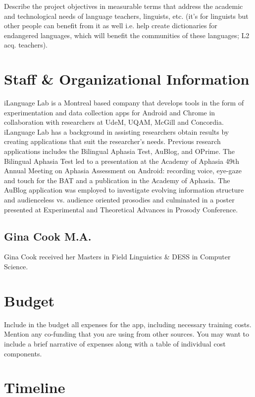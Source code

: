 \documentclass[12 pt]{article}
\begin{document}
Describe the project objectives in measurable terms that address the academic and technological needs of language teachers, linguists, etc. (it's for linguists but other people can benefit from it as well i.e. help create dictionaries for endangered languages, which will benefit the communities of these languages; L2 acq. teachers).  

\section {Staff \& Organizational Information}

 iLanguage Lab is a Montreal based company that develops tools in the form of experimentation and data collection apps for Android and Chrome in collaboration with researchers at UdeM, UQAM, McGill and Concordia. iLanguage Lab has a background in assisting researchers obtain results by creating applications that suit the researcher's needs.  Previous research applications includes the Bilingual Aphasia Test, AuBlog, and OPrime. The Bilingual Aphasia Test led to  a presentation at the  Academy of Aphasia 49th Annual Meeting on  Aphasia Assessment on Android: recording voice, eye-gaze and touch for the BAT and a publication in the Academy of Aphasia.  The AuBlog application was employed to investigate evolving information structure and audienceless vs. audience oriented prosodies and culminated in a poster presented at Experimental and Theoretical Advances in Prosody Conference. 

\subsection{Gina Cook M.A.}

Gina Cook received her Masters in Field Linguistics \& DESS in Computer Science. 





\section {Budget}

Include in the budget all expenses for the app, including necessary training costs. Mention any co-funding that you are using from other sources. You may want to include a brief narrative of expenses along with a table of individual cost components. 

\section {Timeline}
\end{document}
